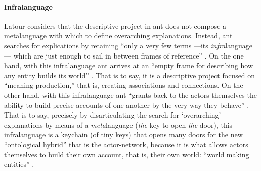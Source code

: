 \paragraph{Infralanguage}
Latour considers that the descriptive project in \gls{ant} does not compose a metalanguage with which to define overarching explanations. Instead, \gls{ant} searches for explications by retaining ``only a very few terms ---its \textit{infra}language--- which are just enough to sail in between frames of reference'' \im \parencite[16]{Lat90:On}. On the one hand, with this infralanguage \gls{ant} arrives at an ``empty frame for describing how any entity builds its world'' \parencite[16]{Lat90:On}. That is to say, it is a descriptive project focused on ``meaning-production,'' that is, creating associations and connections. On the other hand, with this infralanguage \gls{ant} ``grants back to the actors themselves the ability to build precise accounts of one another by the very way they behave'' \parencite[16]{Lat90:On}. That is to say, precisely by disarticulating the search for `overarching' explanations by means of a \textit{meta}language (\textit{the} key to open \textit{the} door), this infralanguage is a keychain (of tiny keys) that opens many doors for the new ``ontological hybrid'' that is the actor-network, because it is what allows actors themselves to build their own account, that is, their own world: ``world making entities'' \parencite[16]{Lat90:On}. 



